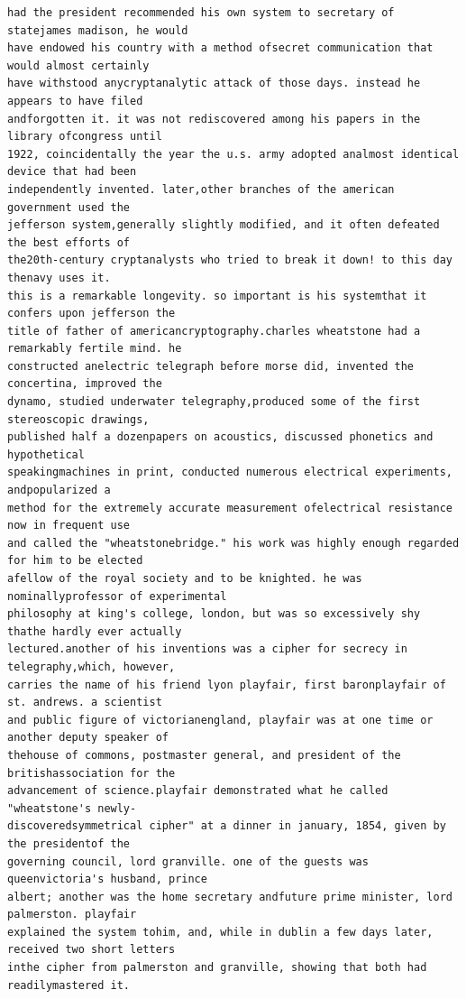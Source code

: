 \documentclass[12pt,a4paper]{article}
\begin{document}
\begin{lstlisting}[style=ciphertext,caption={Complete text after iteration 12}]
had the president recommended his own system to secretary of statejames madison, he would
have endowed his country with a method ofsecret communication that would almost certainly
have withstood anycryptanalytic attack of those days. instead he appears to have filed
andforgotten it. it was not rediscovered among his papers in the library ofcongress until
1922, coincidentally the year the u.s. army adopted analmost identical device that had been
independently invented. later,other branches of the american government used the
jefferson system,generally slightly modified, and it often defeated the best efforts of
the20th-century cryptanalysts who tried to break it down! to this day thenavy uses it.
this is a remarkable longevity. so important is his systemthat it confers upon jefferson the
title of father of americancryptography.charles wheatstone had a remarkably fertile mind. he
constructed anelectric telegraph before morse did, invented the concertina, improved the
dynamo, studied underwater telegraphy,produced some of the first stereoscopic drawings,
published half a dozenpapers on acoustics, discussed phonetics and hypothetical
speakingmachines in print, conducted numerous electrical experiments, andpopularized a
method for the extremely accurate measurement ofelectrical resistance now in frequent use
and called the "wheatstonebridge." his work was highly enough regarded for him to be elected
afellow of the royal society and to be knighted. he was nominallyprofessor of experimental
philosophy at king's college, london, but was so excessively shy thathe hardly ever actually
lectured.another of his inventions was a cipher for secrecy in telegraphy,which, however,
carries the name of his friend lyon playfair, first baronplayfair of st. andrews. a scientist
and public figure of victorianengland, playfair was at one time or another deputy speaker of
thehouse of commons, postmaster general, and president of the britishassociation for the
advancement of science.playfair demonstrated what he called "wheatstone's newly-
discoveredsymmetrical cipher" at a dinner in january, 1854, given by the presidentof the
governing council, lord granville. one of the guests was queenvictoria's husband, prince
albert; another was the home secretary andfuture prime minister, lord palmerston. playfair
explained the system tohim, and, while in dublin a few days later, received two short letters
inthe cipher from palmerston and granville, showing that both had readilymastered it.
\end{lstlisting}
\end{document}
